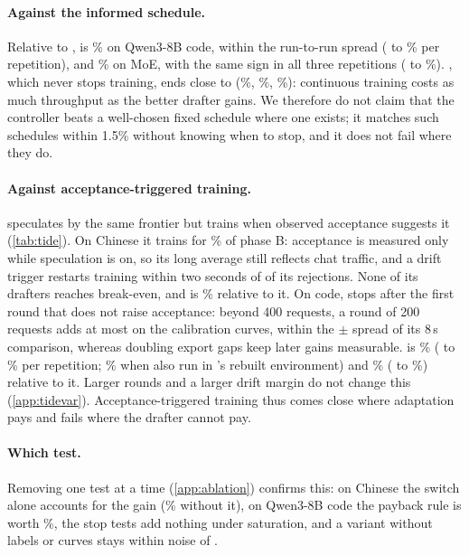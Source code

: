 \paragraph{Against the informed schedule.} Relative to ,  is \% on Qwen3-8B code, within the run-to-run spread ( to \% per repetition), and \% on MoE, with the same sign in all three repetitions ( to \%). , which never stops training, ends close to  (\%, \%, \%): continuous training costs as much throughput as the better drafter gains. We therefore do not claim that the controller beats a well-chosen fixed schedule where one exists; it matches such schedules within 1.5\% without knowing when to stop, and it does not fail where they do.

\paragraph{Against acceptance-triggered training.}  speculates by the same frontier but trains when observed acceptance suggests it (\cref{tab:tide}). On Chinese it trains for \% of phase B: acceptance is measured only while speculation is on, so its long average still reflects chat traffic, and a drift trigger restarts training within two seconds of  of its  rejections. None of its drafters reaches break-even, and  is \% relative to it. On code,  stops after the first round that does not raise acceptance: beyond 400 requests, a round of 200 requests adds at most  on the calibration curves, within the $\pm$ spread of its 8\,s comparison, whereas doubling export gaps keep later gains measurable.  is \% ( to \% per repetition; \% when also run in 's rebuilt environment) and \% ( to \%) relative to it. Larger rounds and a larger drift margin do not change this (\cref{app:tidevar}). Acceptance-triggered training thus comes close where adaptation pays and fails where the drafter cannot pay.

\paragraph{Which test.} Removing one test at a time (\cref{app:ablation}) confirms this: on Chinese the switch alone accounts for the gain (\% without it), on Qwen3-8B code the payback rule is worth \%, the stop tests add nothing under saturation, and a variant without labels or curves stays within noise of .

